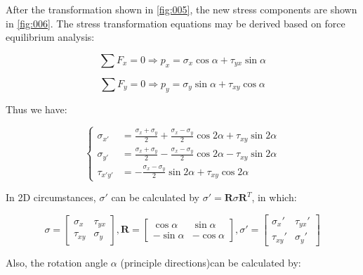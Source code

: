 \documentclass[en,hazy,cyan,8pt,normal]{elegantnote}
\numberwithin{equation}{section}
\begin{document}
    After the transformation shown in \cref{fig:005}, the new stress components are shown in \cref{fig:006}.
    The stress transformation equations may be derived based on force equilibrium analysis:

    \begin{equation}\label{eq:008}
      \sum F_x=0\Rightarrow p_x=\sigma_x\cos\alpha+\tau_{yx}\sin\alpha
    \end{equation}

    \begin{equation}\label{eq:009}
      \sum F_y=0\Rightarrow p_y=\sigma_y\sin\alpha+\tau_{xy}\cos\alpha
    \end{equation}

    Thus we have:

    \begin{equation}\label{eq:010}
      \left\{
      \begin{aligned}
        \sigma_{x'}&=\frac{\sigma_x+\sigma_y}{2}+\frac{\sigma_x-\sigma_y}{2}\cos2\alpha+\tau_{xy}\sin2\alpha\\
        \sigma_{y'}&=\frac{\sigma_x+\sigma_y}{2}-\frac{\sigma_x-\sigma_y}{2}\cos2\alpha-\tau_{xy}\sin2\alpha\\
        \tau_{x'y'}&=-\frac{\sigma_x-\sigma_y}{2}\sin2\alpha+\tau_{xy}\cos2\alpha
      \end{aligned}
      \right.
    \end{equation}

    In 2D circumstances, $\sigma'$ can be calculated by $\sigma'=\mathbf{R}\sigma \mathbf{R}^T$, in which:

    \begin{equation}\label{eq:011}
      \sigma=
      \begin{bmatrix}
        \sigma_x & \tau_{yx}\\
        \tau_{xy} & \sigma_y
      \end{bmatrix}, 
      \mathbf{R}=
      \begin{bmatrix}
        \cos\alpha & \sin\alpha\\
        -\sin\alpha & -\cos\alpha
      \end{bmatrix},
      \sigma'=
      \begin{bmatrix}
        \sigma_x' & \tau_{yx}'\\
        \tau_{xy}' & \sigma_y'
      \end{bmatrix}
    \end{equation}

    Also, the rotation angle $\alpha$ (principle directions)can be calculated by:
\end{document}
